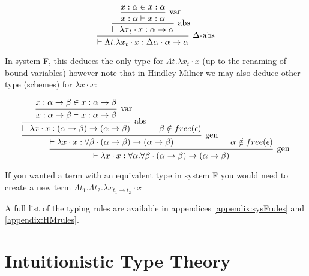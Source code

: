 \documentclass{ProgressReport}[2020/09/15]
\begin{document}
            \[\begin{array}{c}
            \mbox{\begin{prooftree}
                  \hypo{x : \alpha \in x : \alpha}
                \infer1[var]{x : \alpha \vdash x : \alpha}
               \infer1[abs]{\vdash \lambda x_t \cdot x : \alpha \to \alpha}
               \infer1[$\Delta$-abs]{\vdash \Lambda t . \lambda x_t \cdot
                 x : \Delta \alpha \cdot \alpha \to \alpha}
            \end{prooftree}}
            \end{array} \]
            
            In system F, this deduces the only type for $\Lambda t . \lambda x_t
            \cdot x$ (up to the renaming of bound variables) however note that
            in Hindley-Milner we may also deduce other type (schemes)
            for $\lambda x \cdot x$: 
            
            \[\begin{array}{c}
            \mbox{\begin{prooftree}
                        \hypo{x : \alpha \to \beta \in x : \alpha \to \beta}
                    \infer1[var]{x : \alpha \to \beta \vdash x : \alpha \to \beta}   
                    \infer1[abs]{\vdash \lambda x \cdot x : (\alpha \to \beta) \to
                    (\alpha \to \beta)}
                    \hypo{\beta \notin free(\epsilon)}        
                \infer2[gen]{\vdash \lambda x \cdot x : \forall \beta \cdot
                  (\alpha \to \beta) \to (\alpha \to \beta)}
                \hypo{\alpha \notin free(\epsilon)}
               \infer2[gen]{\vdash \lambda x \cdot x : \forall \alpha . \forall
                 \beta \cdot (\alpha \to \beta) \to (\alpha \to \beta)}
            \end{prooftree}}
            \end{array} \]
                                   
            If you wanted a term with an equivalent type in system F you would
            need to create a new term $\Lambda t_1 . \Lambda t_2 . \lambda x_{t_1
              \to t_2} \cdot x$
            
            A full list of the typing rules are available in
            appendices \ref{appendix:sysFrules} and
            \ref{appendix:HMrules}. 
                    
          \section{Intuitionistic Type Theory}
        
\end{document}
